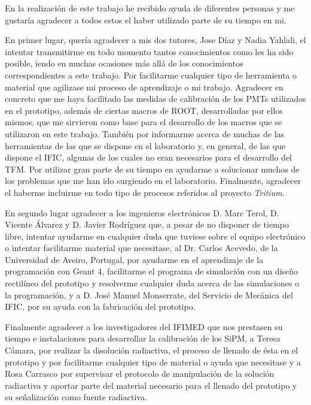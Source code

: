 En la realización de este trabajo he recibido ayuda de diferentes personas y me gustaría agradecer a todos estos el haber utilizado parte de su tiempo en mi.

En primer lugar, quería agradecer a mis dos tutores, Jose Díaz y Nadia Yahlali, el intentar transmitirme en todo momento tantos conocimientos como les ha sido posible, iendo en muchas ocasiones más allá de los conocimientos correspondientes a este trabajo. Por facilitarme cualquier tipo de herramienta o material que agilizase mi proceso de aprendizaje o mi trabajo. Agradecer en concreto que me haya facilitado las medidas de calibración de los PMTs utilizados en el prototipo, además de ciertas macros de ROOT, desarrolladas por ellos mismos, que me sirvieron como base para el desarrollo de los macros que se utilizaron en este trabajo. También por informarme acerca de muchas de las herramientas de las que se dispone en el laboratorio y, en general, de las que dispone el IFIC, algunas de los cuales no eran necesarios para el desarrollo del TFM. Por utilizar gran parte de su tiempo en ayudarme a solucionar muchos de los problemas que me han ido surgiendo en el laboratorio. Finalmente, agradecer el haberme incluirme en todo tipo de procesos referidos al proyecto \textit{Tritium}. 



En segundo lugar agradecer a los ingenieros electrónicos D. Marc Terol, D. Vicente Álvarez  y D. Javier Rodríguez que, a pesar de no disponer de tiempo libre, intentar ayudarme en cualquier duda que tuviese sobre el equipo electrónico o intentar facilitarme material que necesitase, al Dr.  Carlos Acevedo, de la Universidad de Aveiro, Portugal, por ayudarme en el aprendizaje de la programación con Geant 4, facilitarme el programa de simulación con un diseño rectilíneo del prototipo y resolverme cualquier duda acerca de las simulaciones o la programación, y a  D.  José Manuel Monserrate, del Servicio de Mecánica del IFIC, por su ayuda con la fabricación del prototipo.

Finalmente agradecer a los investigadores del IFIMED que nos prestasen su tiempo e instalaciones para desarrollar la calibración de los SiPM, a Teresa Cámara,  por realizar la disolución radiactiva, el proceso de llenado de ésta en el prototipo y por facilitarme cualquier tipo de material o ayuda que necesitase y  a Rosa Carrasco por supervisar el protocolo de manipulación de la solución radiactiva y aportar parte del material necesario para el llenado del prototipo y su señalización como fuente radiactiva.